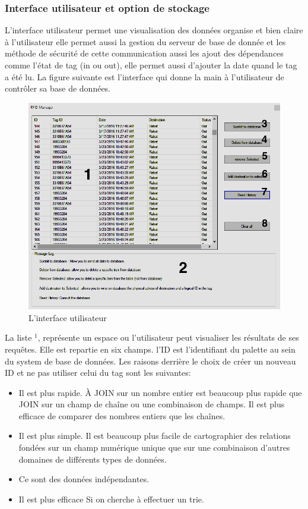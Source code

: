 \documentclass[11pt, a4paper, twoside]{book}
\begin{document}
\subsubsection{Interface utilisateur et option de stockage}
L'interface utilisateur permet  une visualisation des données organise et bien claire à l'utilisateur elle permet aussi  la gestion du serveur de base de donnée et les méthode de sécurité de cette communication aussi les ajout des dépendances comme l'état de tag (in ou out), elle permet aussi d'ajouter la date quand le tag a été lu. La figure suivante est l'interface qui donne la main à l'utilisateur de contrôler sa base de données.\\

\begin{figure}[H]
\centering
\includegraphics[width=\textwidth]{software}
\caption{L'interface utilisateur}
\end{figure}
La liste \(^{1}\), représente un espace ou l'utilisateur peut visualiser les résultats de ses requêtes. Elle est repartie en six champs. l'ID est l'identifiant du palette au sein du system de base de données. Les raisons derrière le choix de créer un nouveau ID et ne pas utiliser celui du tag sont les suivantes:
\begin{itemize}
\item Il est plus rapide. À JOIN sur un nombre entier est beaucoup plus rapide que JOIN sur un champ de chaîne ou une combinaison de champs. Il est plus efficace de comparer des nombres entiers que les chaînes.

\item Il est plus simple. Il est beaucoup plus facile de cartographier des relations fondées sur un champ numérique unique que sur une combinaison d'autres domaines de différents types de données.

\item Ce sont des données indépendantes.

\item  Il est plus efficace Si on cherche à effectuer un trie.\\
\end{itemize}
\end{document}

